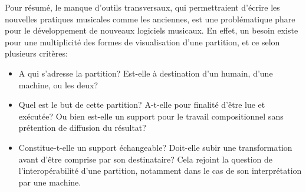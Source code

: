 Pour résumé, le manque d'outils transversaux, qui permettraient d'écrire les nouvelles pratiques musicales comme les anciennes, est une problématique phare pour le développement de nouveaux logiciels musicaux.
En effet, un besoin existe pour une multiplicité des formes de visualisation d'une partition, et ce selon plusieurs critères:
\begin{itemize}[label=--]
	
	\item A qui s'adresse la partition? Est-elle à destination d'un humain, d'une machine, ou les deux?
	
	\item Quel est le but de cette partition? A-t-elle pour finalité d'être lue et exécutée? Ou bien est-elle un support pour le travail compositionnel sans prétention de diffusion du résultat?
	
	\item Constitue-t-elle un support échangeable? Doit-elle subir une transformation avant d'être comprise par son destinataire? Cela rejoint la question de l'interopérabilité d'une partition, notamment dans le cas de son interprétation par une machine.
	
\end{itemize}
